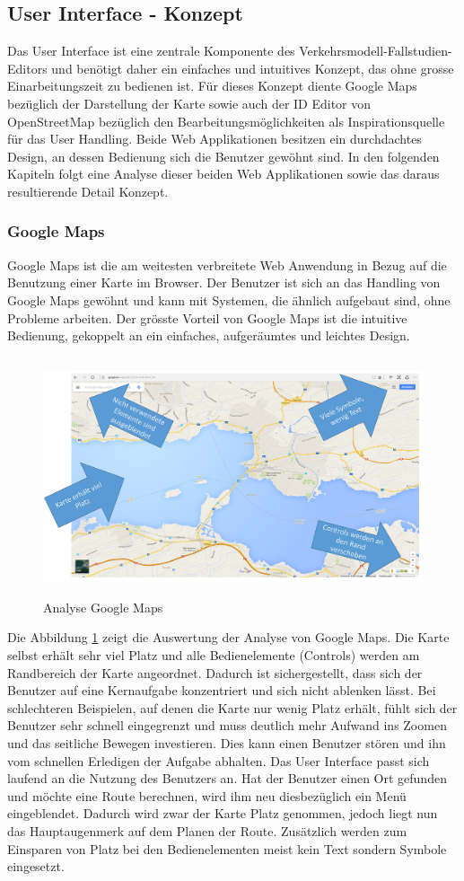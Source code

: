 \subsection{User Interface - Konzept}\label{sec:uiconcept}
Das User Interface ist eine zentrale Komponente des Verkehrsmodell-Fallstudien-Editors und benötigt daher ein einfaches und intuitives Konzept, das ohne grosse Einarbeitungszeit zu bedienen ist. Für dieses Konzept diente Google Maps \cite{GoogleMaps} bezüglich der Darstellung der Karte sowie auch der ID Editor \citep{IDEditor} von OpenStreetMap bezüglich den Bearbeitungsmöglichkeiten als Inspirationsquelle für das User Handling. Beide Web Applikationen besitzen ein durchdachtes Design, an dessen Bedienung sich die Benutzer gewöhnt sind. In den folgenden Kapiteln folgt eine Analyse dieser beiden Web Applikationen sowie das daraus resultierende Detail Konzept.
\newpage
\subsubsection{Google Maps}
Google Maps ist die am weitesten verbreitete Web Anwendung in Bezug auf die Benutzung einer Karte im Browser. Der Benutzer ist sich an das Handling von Google Maps gewöhnt und kann mit Systemen, die ähnlich aufgebaut sind, ohne Probleme arbeiten. Der grösste Vorteil von Google Maps ist die intuitive Bedienung, gekoppelt an ein einfaches, aufgeräumtes und leichtes Design.
\begin{figure}[H]
\centering
\includegraphics[height=7cm]{images/AnalyseGoogle.png}
\caption{Analyse Google Maps}
\label{fig:googlemaps}
\end{figure}
\noindent
Die Abbildung \ref{fig:googlemaps} zeigt die Auswertung der Analyse von Google Maps. Die Karte selbst erhält sehr viel Platz und alle Bedienelemente (Controls) werden am Randbereich der Karte angeordnet. Dadurch ist sichergestellt, dass sich der Benutzer auf eine Kernaufgabe konzentriert und sich nicht ablenken lässt. Bei schlechteren Beispielen, auf denen die Karte nur wenig Platz erhält, fühlt sich der Benutzer sehr schnell eingegrenzt und muss deutlich mehr Aufwand ins Zoomen und das seitliche Bewegen investieren. Dies kann einen Benutzer stören und ihn vom schnellen Erledigen der Aufgabe abhalten. Das User Interface passt sich laufend an die Nutzung des Benutzers an. Hat der Benutzer einen Ort gefunden und möchte eine Route berechnen, wird ihm neu diesbezüglich ein Menü eingeblendet. Dadurch wird zwar der Karte Platz genommen, jedoch liegt nun das Hauptaugenmerk auf dem Planen der Route. Zusätzlich werden zum Einsparen von Platz bei den Bedienelementen meist kein Text sondern Symbole eingesetzt.

